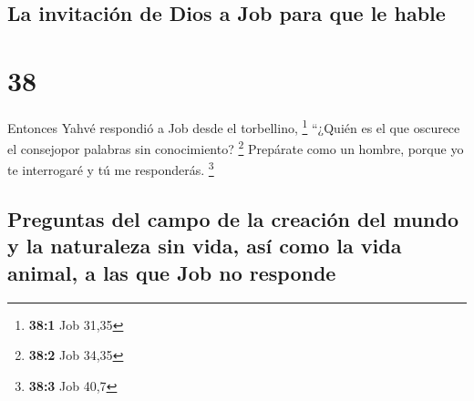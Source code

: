 \hypertarget{la-invitaciuxf3n-de-dios-a-job-para-que-le-hable}{%
\subsection{La invitación de Dios a Job para que le
hable}\label{la-invitaciuxf3n-de-dios-a-job-para-que-le-hable}}

\hypertarget{section-37}{%
\section{38}\label{section-37}}

 Entonces Yahvé respondió a Job desde el torbellino,
\footnote{\textbf{38:1} Job 31,35}  ``¿Quién es el que
oscurece el consejopor palabras sin conocimiento? \footnote{\textbf{38:2}
  Job 34,35}  Prepárate como un hombre, porque yo te
interrogaré y tú me responderás. \footnote{\textbf{38:3} Job 40,7}

\hypertarget{preguntas-del-campo-de-la-creaciuxf3n-del-mundo-y-la-naturaleza-sin-vida-asuxed-como-la-vida-animal-a-las-que-job-no-responde}{%
\subsection{Preguntas del campo de la creación del mundo y la naturaleza
sin vida, así como la vida animal, a las que Job no
responde}\label{preguntas-del-campo-de-la-creaciuxf3n-del-mundo-y-la-naturaleza-sin-vida-asuxed-como-la-vida-animal-a-las-que-job-no-responde}}

